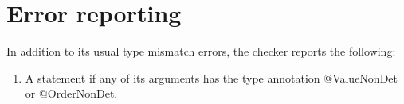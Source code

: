 \section{Error reporting\label{Sec:error}}
In addition to its usual type mismatch errors, the checker reports the following:
\begin{enumerate}
	\item A  statement if any of its arguments has the type annotation @ValueNonDet or @OrderNonDet.	
\end{enumerate}
